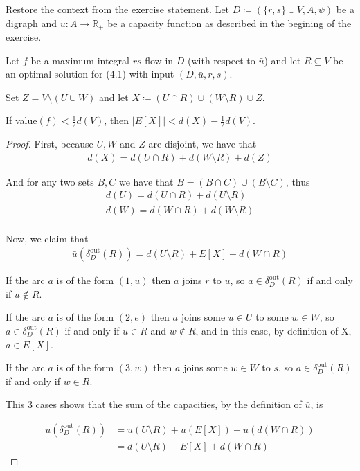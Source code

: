 \documentclass[a4paper,10pt, leqno]{article}
\theoremstyle{definition}
\begin{document}
\begin{lemma}

    Restore the context from the exercise statement. Let $D \coloneqq (\{r, s\} \cup V, A, \psi)$ be a digraph and $\bar{u} : A \to \mathbb{R}_+$ be a capacity function as described in the begining of the exercise. 
    
    Let $f$ be a maximum integral $rs$-flow in $D$ (with respect to $\bar{u}$) and let $R \subseteq V$ be an optimal solution for (4.1) with input $(D, \bar{u}, r, s)$.
    
    Set $Z = V \setminus (U \cup W)$ and
    let $X \coloneqq (U \cap R) \cup (W \setminus R) \cup Z$. 
    
    If value$(f) < \frac{1}{2} d(V)$, then $|E[X]| < d(X) - \frac{1}{2} d(V)$.
\end{lemma}
\begin{proof}
First, because $U, W$ and $Z$ are disjoint, we have that
\begin{align*}
 \tag{11.11}
 d(X) = d(U \cap R) + d(W \setminus R) + d(Z)
\end{align*}

And for any two sets $B, C$ we have that
$B = (B \cap C) \cup (B \setminus C)$, thus
\begin{align*}
 \tag{11.12}
 d(U) = d(U \cap R) + d(U \setminus R) \\
 \tag{11.13}
 d(W) = d(W \cap R) + d(W \setminus R) \\
\end{align*}

Now, we claim that 
\begin{align*}
\tag{11.14}
\bar{u}(\delta_D^{\text{out}}(R)) = d(U \setminus R) + E[X] + d(W \cap R)
\end{align*}

If the arc $a$ is of the form $(1, u)$ then $a$ joins $r$ to $u$, so $a \in \delta_D^{\text{out}}(R)$ if and only if $u \notin R$.

If the arc $a$ is of the form $(2, e)$ then $a$ joins some $u \in U$ to some $w \in W$, so $a \in \delta_D^{\text{out}}(R)$ if and only if $u \in R$ and $w \notin R$, and in this case, by definition of X, $a \in E[X]$.

If the arc $a$ is of the form $(3, w)$ then $a$ joins some $w \in W$ to $s$, so $a \in \delta_D^{\text{out}}(R)$ if and only if $w \in R$.

This 3 cases shows that the sum of the capacities, by the definition of $\bar{u}$, is 

\begin{align*}
\bar{u}(\delta_D^{\text{out}}(R)) &= \bar{u}(U \setminus R) + \bar{u}(E[X]) + \bar{u}(d(W \cap R)) \\
&= d(U \setminus R) + E[X] + d(W \cap R)
\end{align*}


\end{proof}
\end{document}
